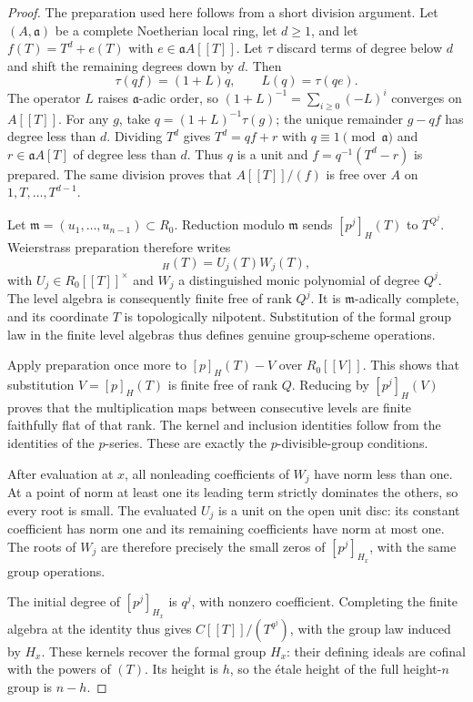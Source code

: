 \begin{proof}
The preparation used here follows from a short division argument.
Let $(A,\mathfrak a)$ be a complete Noetherian local ring, let $d\geq1$, and let
$f(T)=T^d+e(T)$ with $e\in\mathfrak a A[[T]]$.
Let $\tau$ discard terms of degree below $d$ and shift the remaining
degrees down by $d$.  Then
\[
 \tau(qf)=(1+L)q,\qquad L(q)=\tau(qe).
\]
The operator $L$ raises $\mathfrak a$-adic order, so
$(1+L)^{-1}=\sum_{i\geq0}(-L)^i$ converges on $A[[T]]$.
For any $g$, take $q=(1+L)^{-1}\tau(g)$; the unique remainder
$g-qf$ has degree less than $d$.  Dividing $T^d$ gives
$T^d=qf+r$ with $q\equiv1\pmod{\mathfrak a}$ and
$r\in\mathfrak a A[T]$ of degree less than $d$.
Thus $q$ is a unit and $f=q^{-1}(T^d-r)$ is prepared.
The same division proves that $A[[T]]/(f)$ is free over $A$ on
$1,T,\ldots,T^{d-1}$.

Let $\mathfrak m=(u_1,\ldots,u_{n-1})\subset R_0$.  Reduction modulo
$\mathfrak m$ sends $[p^j]_H(T)$ to $T^{Q^j}$.  Weierstrass preparation
therefore writes
\begin{equation}
 [p^j]_H(T)=U_j(T)W_j(T),
 \label{def:prepared-level}
\end{equation}
with $U_j\in R_0[[T]]^\times$ and $W_j$ a distinguished monic polynomial
of degree $Q^j$.  The level algebra is consequently finite free of rank
$Q^j$.  It is $\mathfrak m$-adically complete, and its coordinate $T$ is
topologically nilpotent.  Substitution of the formal group law in the
finite level algebras thus defines genuine group-scheme operations.

Apply preparation once more to $[p]_H(T)-V$ over $R_0[[V]]$.  This shows
that substitution $V=[p]_H(T)$ is finite free of rank $Q$.  Reducing by
$[p^j]_H(V)$ proves that the multiplication maps between consecutive
levels are finite faithfully flat of that rank.  The kernel and inclusion
identities follow from the identities of the $p$-series.  These are exactly
the $p$-divisible-group conditions.

After evaluation at $x$, all nonleading coefficients of $W_j$ have norm
less than one.  At a point of norm at least one its leading term strictly
dominates the others, so every root is small.  The evaluated $U_j$ is a unit
on the open unit disc: its constant coefficient has norm one and its
remaining coefficients have norm at most one.  The roots of $W_j$ are
therefore precisely the small zeros of $[p^j]_{H_x}$, with the same group
operations.

The initial degree of $[p^j]_{H_x}$ is $q^j$, with nonzero coefficient.
Completing the finite algebra at the identity thus gives
$C[[T]]/(T^{q^j})$, with the group law induced by $H_x$.  These kernels
recover the formal group $H_x$: their defining ideals are cofinal with
the powers of $(T)$.  Its height is $h$, so the \'etale height of
the full height-$n$ group is $n-h$.
\end{proof}

